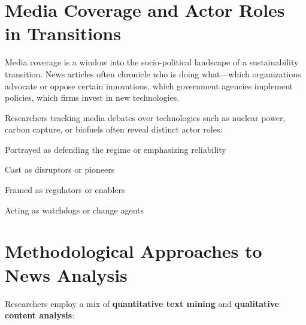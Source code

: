 \documentclass[../main.tex]{subfiles}
\begin{document}
\section*{Media Coverage and Actor Roles in Transitions}

Media coverage is a window into the socio-political landscape of a sustainability transition. News articles often chronicle who is doing what---which organizations advocate or oppose certain innovations, which government agencies implement policies, which firms invest in new technologies.


Researchers tracking media debates over technologies such as nuclear power, carbon capture, or biofuels often reveal distinct actor roles:

\begin{description}[leftmargin=0.5cm]
\item[Incumbent firms] Portrayed as defending the regime or emphasizing reliability
\item[Innovative startups] Cast as disruptors or pioneers
\item[Government officials] Framed as regulators or enablers
\item[NGOs/advocates] Acting as watchdogs or change agents
\end{description}


\section*{Methodological Approaches to News Analysis}

Researchers employ a mix of \textbf{quantitative text mining} and \textbf{qualitative content analysis}:
\end{document}
